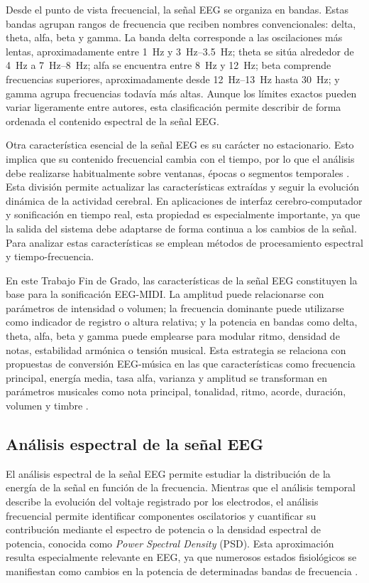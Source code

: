 \documentclass[../main.tex]{subfiles}
\begin{document}
Desde el punto de vista frecuencial, la señal EEG se organiza en bandas. Estas bandas agrupan rangos de frecuencia que reciben nombres convencionales: delta, theta, alfa, beta y gamma. La banda delta corresponde a las oscilaciones más lentas, aproximadamente entre \SI{1}{\hertz} y \SI{3}{\hertz}--\SI{3.5}{\hertz}; theta se sitúa alrededor de \SI{4}{\hertz} a \SI{7}{\hertz}--\SI{8}{\hertz}; alfa se encuentra entre \SI{8}{\hertz} y \SI{12}{\hertz}; beta comprende frecuencias superiores, aproximadamente desde \SI{12}{\hertz}--\SI{13}{\hertz} hasta \SI{30}{\hertz}; y gamma agrupa frecuencias todavía más altas. Aunque los límites exactos pueden variar ligeramente entre autores, esta clasificación permite describir de forma ordenada el contenido espectral de la señal EEG.

Otra característica esencial de la señal EEG es su carácter no estacionario. Esto implica que su contenido frecuencial cambia con el tiempo, por lo que el análisis debe realizarse habitualmente sobre ventanas, épocas o segmentos temporales \cite{Sawa2022}. Esta división permite actualizar las características extraídas y seguir la evolución dinámica de la actividad cerebral. En aplicaciones de interfaz cerebro-computador y sonificación en tiempo real, esta propiedad es especialmente importante, ya que la salida del sistema debe adaptarse de forma continua a los cambios de la señal. Para analizar estas características se emplean métodos de procesamiento espectral y tiempo-frecuencia.

En este Trabajo Fin de Grado, las características de la señal EEG constituyen la base para la sonificación EEG-MIDI. La amplitud puede relacionarse con parámetros de intensidad o volumen; la frecuencia dominante puede utilizarse como indicador de registro o altura relativa; y la potencia en bandas como delta, theta, alfa, beta y gamma puede emplearse para modular ritmo, densidad de notas, estabilidad armónica o tensión musical. Esta estrategia se relaciona con propuestas de conversión EEG-música en las que características como frecuencia principal, energía media, tasa alfa, varianza y amplitud se transforman en parámetros musicales como nota principal, tonalidad, ritmo, acorde, duración, volumen y timbre \cite{Wu2010}.


\subsection{Análisis espectral de la señal EEG}

El análisis espectral de la señal EEG permite estudiar la distribución de la energía de la señal en función de la frecuencia. Mientras que el análisis temporal describe la evolución del voltaje registrado por los electrodos, el análisis frecuencial permite identificar componentes oscilatorios y cuantificar su contribución mediante el espectro de potencia o la densidad espectral de potencia, conocida como \textit{Power Spectral Density} (PSD). Esta aproximación resulta especialmente relevante en EEG, ya que numerosos estados fisiológicos se manifiestan como cambios en la potencia de determinadas bandas de frecuencia \cite{Sawa2022}.
\end{document}
